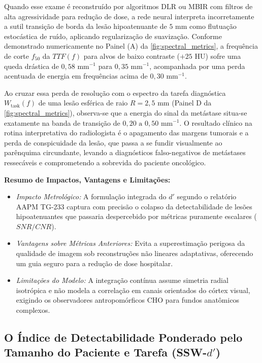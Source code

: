 \documentclass[
  12pt,
  a4paper,
  oneside
]{report}
\begin{document}
Quando esse exame é reconstruído por algoritmos DLR ou MBIR com filtros de alta agressividade para redução de dose, a rede neural interpreta incorretamente a sutil transição de borda da lesão hipoatenuante de $5\text{ mm}$ como flutuação estocástica de ruído, aplicando regularização de suavização. Conforme demonstrado numericamente no Painel (A) da \cref{fig:spectral_metrics}, a frequência de corte $f_{50}$ da $TTF(f)$ para alvos de baixo contraste ($+25\text{ HU}$) sofre uma queda drástica de $0{,}58\text{ mm}^{-1}$ para $0{,}35\text{ mm}^{-1}$, acompanhada por uma perda acentuada de energia em frequências acima de $0{,}30\text{ mm}^{-1}$.

Ao cruzar essa perda de resolução com o espectro da tarefa diagnóstica $W_{\text{task}}(f)$ de uma lesão esférica de raio $R = 2{,}5\text{ mm}$ (Painel D da \cref{fig:spectral_metrics}), observa-se que a energia do sinal da metástase situa-se exatamente na banda de transição de $0{,}20\text{ a } 0{,}50\text{ mm}^{-1}$. O resultado clínico na rotina interpretativa do radiologista é o apagamento das margens tumorais e a perda de conspicuidade da lesão, que passa a se fundir visualmente ao parênquima circundante, levando a diagnósticos falso-negativos de metástases ressecáveis e comprometendo a sobrevida do paciente oncológico.

\noindent\textbf{Resumo de Impactos, Vantagens e Limitações:}
\begin{itemize}[leftmargin=*,noitemsep]
  \item \emph{Impacto Metrológico:} A formulação integrada do $d'$ segundo o relatório AAPM TG-233 captura com precisão o colapso da detectabilidade de lesões hipoatenuantes que passaria despercebido por métricas puramente escalares ($SNR/CNR$).
  \item \emph{Vantagens sobre Métricas Anteriores:} Evita a superestimação perigosa da qualidade de imagem sob reconstruções não lineares adaptativas, oferecendo um guia seguro para a redução de dose hospitalar.
  \item \emph{Limitações do Modelo:} A integração contínua assume simetria radial isotrópica e não modela a correlação em canais orientados do córtex visual, exigindo os observadores antropomórficos CHO para fundos anatômicos complexos.
\end{itemize}

\subsection{O Índice de Detectabilidade Ponderado pelo Tamanho do Paciente e Tarefa (SSW-\texorpdfstring{$d'$}{d'})}
\label{subsec:ssw_dprime_completo}
\end{document}
